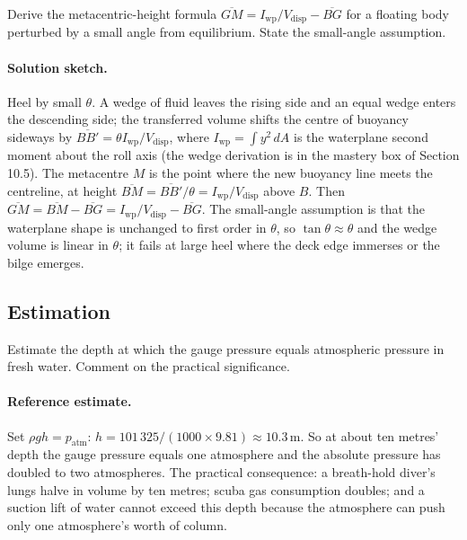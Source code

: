 \begin{exercise}
Derive the metacentric-height formula $\overline{GM} = I_{\text{
wp}}/V_{\text{disp}} - \overline{BG}$ for a floating body
perturbed by a small angle from equilibrium. State the
small-angle assumption.

\paragraph{Solution sketch.} Heel by small $\theta$. A wedge of fluid
leaves the rising side and an equal wedge enters the descending side;
the transferred volume shifts the centre of buoyancy sideways by
$\overline{BB'} = \theta I_{\text{wp}}/V_{\text{disp}}$, where
$I_{\text{wp}} = \int y^2\,dA$ is the waterplane second moment about the
roll axis (the wedge derivation is in the mastery box of Section 10.5).
The metacentre $M$ is the point where the new buoyancy line meets the
centreline, at height $\overline{BM} = \overline{BB'}/\theta =
I_{\text{wp}}/V_{\text{disp}}$ above $B$. Then $\overline{GM} =
\overline{BM} - \overline{BG} = I_{\text{wp}}/V_{\text{disp}} -
\overline{BG}$. The small-angle assumption is that the waterplane shape
is unchanged to first order in $\theta$, so $\tan\theta \approx \theta$
and the wedge volume is linear in $\theta$; it fails at large heel where
the deck edge immerses or the bilge emerges.
\end{exercise}

\subsection*{Estimation}

\begin{exercise}
Estimate the depth at which the gauge pressure equals atmospheric
pressure in fresh water. Comment on the practical significance.

\paragraph{Reference estimate.} Set $\rho g h = p_{\text{atm}}$:
$h = 101\,325/(1000 \times 9.81) \approx 10.3\,\si{\meter}$. So at about
ten metres' depth the gauge pressure equals one atmosphere and the
absolute pressure has doubled to two atmospheres. The practical
consequence: a breath-hold diver's lungs halve in volume by ten metres;
scuba gas consumption doubles; and a suction lift of water cannot exceed
this depth because the atmosphere can push only one atmosphere's worth
of column.
\end{exercise}

